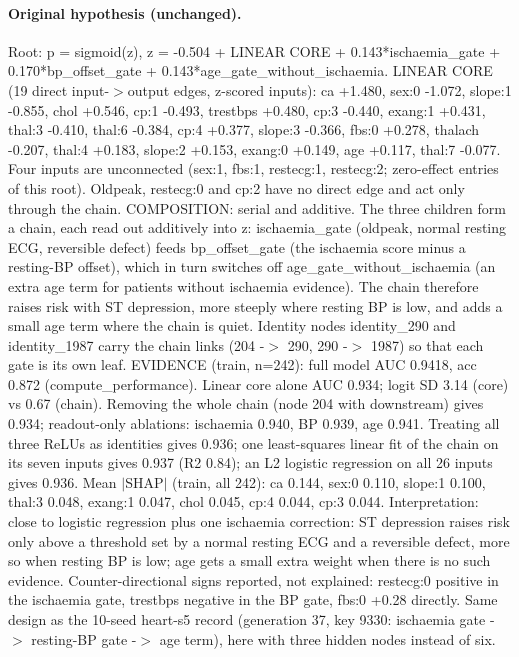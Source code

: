 \documentclass[a4paper,10pt]{article}
\newif\ifreviewmarks
\newcommand{\reviewrule}{\noindent{\color{BrickRed}\rule{\linewidth}{0.8pt}}}
\newenvironment{drafted}[1][]{%
  \ifreviewmarks\par\addvspace{\medskipamount}\reviewrule\par\nopagebreak
  \noindent{\color{BrickRed}\sffamily\footnotesize\textbf{Thesis Draft}\quad #1\hfill review}\par\nopagebreak\smallskip\fi}{%
  \ifreviewmarks\par\smallskip\noindent{\color{BrickRed}\sffamily\footnotesize end of thesis draft}\par\nopagebreak\reviewrule\par\medskip\fi}
\begin{document}
\begin{drafted}[plain-language layer: heart-s5-c1]
\paragraph{Original hypothesis (unchanged).} Root: p = sigmoid(z), z = -0.504 + LINEAR CORE + 0.143*ischaemia\_\allowbreak{}gate + 0.170*bp\_\allowbreak{}offset\_\allowbreak{}gate + 0.143*\allowbreak{}age\_\allowbreak{}gate\_\allowbreak{}without\_\allowbreak{}ischaemia. LINEAR CORE (19 direct input-$>$output edges, z-scored inputs): ca +1.480, sex:0 -1.072, slope:1 -0.855, chol +0.546, cp:1 -0.493, trestbps +0.480, cp:3 -0.440, exang:1 +0.431, thal:3 -0.410, thal:6 -0.384, cp:4 +0.377, slope:3 -0.366, fbs:0 +0.278, thalach -0.207, thal:4 +0.183, slope:2 +0.153, exang:0 +0.149, age +0.117, thal:7 -0.077. Four inputs are unconnected (sex:1, fbs:1, restecg:1, restecg:2; zero-effect entries of this root). Oldpeak, restecg:0 and cp:2 have no direct edge and act only through the chain. COMPOSITION: serial and additive. The three children form a chain, each read out additively into z: ischaemia\_\allowbreak{}gate (oldpeak, normal resting ECG, reversible defect) feeds bp\_\allowbreak{}offset\_\allowbreak{}gate (the ischaemia score minus a resting-BP offset), which in turn switches off age\_\allowbreak{}gate\_\allowbreak{}without\_\allowbreak{}ischaemia (an extra age term for patients without ischaemia evidence). The chain therefore raises risk with ST depression, more steeply where resting BP is low, and adds a small age term where the chain is quiet. Identity nodes identity\_\allowbreak{}290 and identity\_\allowbreak{}1987 carry the chain links (204 -$>$ 290, 290 -$>$ 1987) so that each gate is its own leaf. EVIDENCE (train, n=242): full model AUC 0.9418, acc 0.872 (compute\_\allowbreak{}performance)\allowbreak{}. Linear core alone AUC 0.934; logit SD 3.14 (core) vs 0.67 (chain). Removing the whole chain (node 204 with downstream) gives 0.934; readout-only ablations: ischaemia 0.940, BP 0.939, age 0.941. Treating all three ReLUs as identities gives 0.936; one least-squares linear fit of the chain on its seven inputs gives 0.937 (R2 0.84); an L2 logistic regression on all 26 inputs gives 0.936. Mean $|$SHAP$|$ (train, all 242): ca 0.144, sex:0 0.110, slope:1 0.100, thal:3 0.048, exang:1 0.047, chol 0.045, cp:4 0.044, cp:3 0.044. Interpretation: close to logistic regression plus one ischaemia correction: ST depression raises risk only above a threshold set by a normal resting ECG and a reversible defect, more so when resting BP is low; age gets a small extra weight when there is no such evidence. Counter-directional signs reported, not explained: restecg:0 positive in the ischaemia gate, trestbps negative in the BP gate, fbs:0 +0.28 directly. Same design as the 10-seed heart-s5 record (generation 37, key 9330: ischaemia gate -$>$ resting-BP gate -$>$ age term), here with three hidden nodes instead of six.

\end{drafted}
\end{document}
